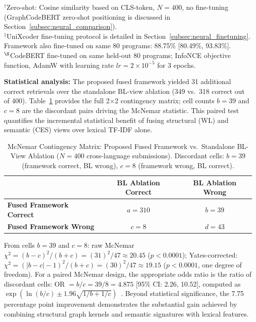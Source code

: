 \begin{table}[ht]
\begin{tabular}{|l|c|c|}
\hline
\end{tabular}
\begin{flushleft}
\footnotesize
$^{\dagger}$Zero-shot: Cosine similarity based on CLS-token, $N=400$, no fine-tuning (GraphCodeBERT zero-shot positioning is discussed in Section~\ref{subsec:neural_comparison}).\\
$^{\ddagger}$UniXcoder fine-tuning protocol is detailed in Section~\ref{subsec:neural_finetuning}. Framework also fine-tuned on same 80 programs: 88.75\% [80.49\%, 93.83\%].\\
$^{\S}$CodeBERT fine-tuned on same held-out 80 programs; InfoNCE objective function, AdamW with learning rate $lr{=}2{\times}10^{-5}$ for 3 epochs.
\end{flushleft}
\end{table}

\textbf{Statistical analysis:} The proposed fused framework yielded 31 additional correct retrievals over the standalone BL-view ablation (349 vs.\ 318 correct out of 400). Table~\ref{tab:mcnemar_contingency} provides the full 2$\times$2 contingency matrix; cell counts $b=39$ and $c=8$ are the discordant pairs driving the McNemar statistic. This paired test quantifies the incremental statistical benefit of fusing structural (WL) and semantic (CES) views over lexical TF-IDF alone.

\begin{table}[ht]
\caption{McNemar Contingency Matrix: Proposed Fused Framework vs.\ Standalone BL-View Ablation ($N=400$ cross-language submissions). Discordant cells: $b=39$ (framework correct, BL wrong), $c=8$ (framework wrong, BL correct).}
\label{tab:mcnemar_contingency}
\centering
\begin{tabular}{|l|c|c|}
\hline
 & \textbf{BL Ablation Correct} & \textbf{BL Ablation Wrong} \\
\hline
\textbf{Fused Framework Correct} & $a = 310$ & $b = 39$ \\
\textbf{Fused Framework Wrong}   & $c = 8$   & $d = 43$ \\
\hline
\end{tabular}
\end{table}

From cells $b=39$ and $c=8$: raw McNemar~\cite{ref_mcnemar1947} $\chi^2 = (b-c)^2/(b+c) = (31)^2/47 \approx 20.45$ ($p < 0.0001$); Yates-corrected: $\chi^2 = (|b-c|-1)^2/(b+c) = (30)^2/47 \approx 19.15$ ($p < 0.0001$, one degree of freedom). For a paired McNemar design, the appropriate odds ratio is the ratio of discordant cells: OR $= b/c = 39/8 = 4.875$ [95\% CI: 2.26, 10.52], computed as $\exp(\ln(b/c) \pm 1.96\sqrt{1/b+1/c})$~\cite{ref_fleiss2003}. Beyond statistical significance, the 7.75 percentage point improvement demonstrates the substantial gain achieved by combining structural graph kernels and semantic signatures with lexical features.

